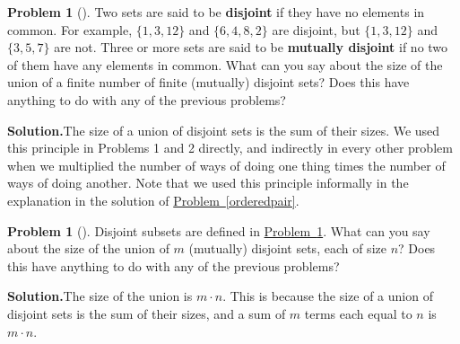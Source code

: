 \documentclass[10pt,]{book}
\newcommand{\terminology}[1]{\textbf{#1}}
\theoremstyle{plain}
\theoremstyle{definition}
\newtheorem{activity}[project]{Problem}
\theoremstyle{definition}
\numberwithin{equation}{chapter}
\begin{document}
\begin{activity}[]\label{sum}
Two sets are said to be \terminology{disjoint} if they have no elements in common. For example, \(\{1,3,12\}\) and \(\{6, 4, 8, 2\}\) are disjoint, but \(\{1,3,12\}\) and \(\{3,5,7\}\) are not. Three or more sets are said to be \terminology{mutually disjoint} if no two of them have any elements in common. What can you say about the size of the union of a finite number of finite (mutually) disjoint sets? Does this have anything to do with any of the previous problems?%
\par\medskip\noindent%
\textbf{Solution.}\quad The size of a union of disjoint sets is the sum of their sizes. We used this principle in Problems 1 and 2 directly, and indirectly in every other problem when we multiplied the number of ways of doing one thing times the number of ways of doing another. Note that we used this principle informally in the explanation in the solution of \hyperref[orderedpair]{Problem~\ref{orderedpair}}.%
\end{activity}
\begin{activity}[]\label{product}
Disjoint subsets are defined in \hyperref[sum]{Problem~\ref{sum}}. What can you say about the size of the union of \(m\) (mutually) disjoint sets, each of size \(n\)? Does this have anything to do with any of the previous problems?%
\par\medskip\noindent%
\textbf{Solution.}\quad The size of the union is \(m\cdot n\). This is because the size of a union of disjoint sets is the sum of their sizes, and a sum of \(m\) terms each equal to \(n\) is \(m\cdot n\).%
\end{activity}
\typeout{************************************************}
\typeout{************************************************}
\end{document}

